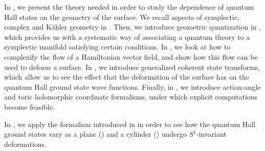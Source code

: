 \documentclass[notas.tex]{subfiles}
\begin{document}
In , we present the theory needed in order to study the dependence of quantum Hall states on the geometry of the surface. We recall aspects of symplectic, complex and Kähler geometry in . Then, we introduce geometric quantization in , which provides us with a systematic way of associating a quantum theory to a symplectic manifold satisfying certain conditions. In , we look at how to complexify the flow of a Hamiltonian vector field, and show how this flow can be used to deform a surface. In , we introduce generalized coherent state transforms, which allow us to see the effect that the deformation of the surface has on the quantum Hall ground state wave functions. Finally, in , we introduce action-angle and toric holomorphic coordinate formalisms, under which explicit computations become feasible.

In , we apply the formalism introduced in  in order to see how the quantum Hall ground states vary as a plane () and a cylinder () undergo $S^1$-invariant deformations.
\end{document}
